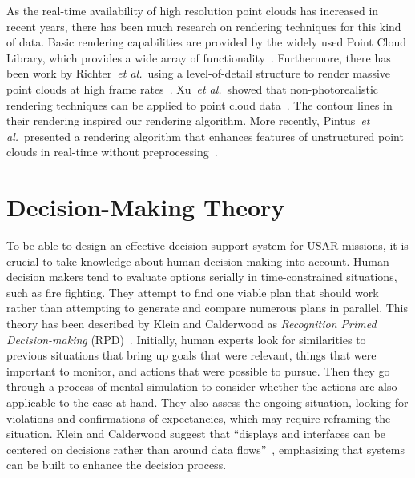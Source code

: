 \documentclass[review,journal]{vgtc}         %
\def\etal{\textit{et al.}}
\begin{document}

 As the real-time availability of high resolution point clouds has increased in recent years, there has been much research on rendering techniques for this kind of data. Basic rendering capabilities are provided by the widely used Point Cloud Library, which provides a wide array of functionality~\cite{Rusu11ICRA}. Furthermore, there has been work by Richter~\etal\ using a level-of-detail structure to render massive point clouds at high frame rates~\cite{Richter:2010:ORV:1811158.1811178}. Xu~\etal\ showed that non-photorealistic rendering techniques can be applied to point cloud data~\cite{conf/npar/XuC04}. The contour lines in their rendering inspired our rendering algorithm. More recently, Pintus~\etal\ presented a rendering algorithm that enhances features of unstructured point clouds in real-time without preprocessing~\cite{Pintus:2011:RRM:2384495.2384513}.


\section{Decision-Making Theory} \label{sec:theory}
To be able to design an effective decision support system for USAR missions, it is crucial to take knowledge about human decision making into account. Human decision makers tend to evaluate options serially in time-constrained situations, such as fire fighting. They attempt to find one viable plan that should work rather than attempting to generate and compare numerous plans in parallel. This theory has been described by Klein and Calderwood as \emph{Recognition Primed Decision-making} (RPD)~\cite{KleinCalderwood}. Initially, human experts look for similarities to previous situations that bring up goals that were relevant, things that were important to monitor, and actions that were possible to pursue. Then they go through a process of mental simulation to consider whether the actions are also applicable to the case at hand. They also assess the ongoing situation, looking for violations and confirmations of expectancies, which may require reframing the situation. Klein and Calderwood suggest that ``displays and interfaces can be centered on decisions rather than around data flows''~\cite{KleinCalderwood}, emphasizing that systems can be built to enhance the decision process. 
\end{document}
